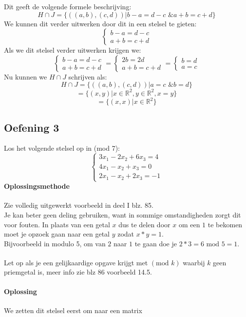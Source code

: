 \documentclass[11pt,a4paper,titlepage]{article}
\begin{document}
Dit geeft de volgende formele beschrijving:
$$ H \cap J = \{((a, b),(c, d))|b-a = d-c \text{ \& } a+b = c+d\}$$
We kunnen dit verder uitwerken door dit in een stelsel te gieten:
$$
\begin{cases}
	b-a = d-c \\
	a+b = c+d
\end{cases}$$
Als we dit stelsel verder uitwerken krijgen we: 
$$
\begin{cases}
	b-a = d-c \\
	a+b = c+d
\end{cases}
=
\begin{cases}
	2b = 2d \\
	a+b = c+d
\end{cases}
=
\begin{cases}
	b = d \\
	a = c
\end{cases}
$$
Nu kunnen we $ H \cap J $ schrijven als:
	$$ H \cap J = \{((a, b),(c, d))| a = c \text{ \& } b = d\}$$
	$$= \{ (x,y) | x \in \mathbb{R}^2 , y \in \mathbb{R}^2 ,x =y \}$$ 
	$$= \{ (x,x) | x \in \mathbb{R}^2 \}$$
\subsection{Oefening 3}
Los het volgende stelsel op in (mod 7):
$$
\begin{cases}
	3x_1 - 2x_2 + 6x_3 = 4\\
	4x_1 - x_2 + x_3 = 0 \\
	2x_1 - x_2 + 2x_3 = -1
\end{cases}$$
\textbf{Oplossingsmethode}\\ \\
Zie volledig uitgewerkt voorbeeld in deel I blz. 85. \\
Je kan beter geen deling gebruiken, want in sommige omstandigheden zorgt dit voor fouten. In plaats van een getal $x$ dus te delen door $x$ om een $1$ te bekomen moet je opzoek gaan naar een getal $y$ zodat $x*y=1$.\\
Bijvoorbeeld in modulo 5, om van $2$ naar $1$ te gaan doe je $2*3 = 6 \text{ mod } 5 = 1$.\\ \\
Let op als je een gelijkaardige opgave krijgt met $(\text{mod } k)$ waarbij $k$ geen priemgetal is, meer info zie blz 86 voorbeeld 14.5. \\ \\
\textbf{Oplossing}\\ \\
We zetten dit stelsel eerst om naar een matrix
\end{document}
